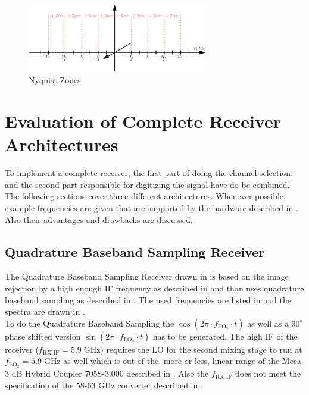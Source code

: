 \begin{figure}[p]
  \centering
  \includegraphics[width=0.7\textwidth]{figures/rx_adc_2_nyquist_zones}
  \caption{Nyquist-Zones}
  \label{fig:rx_adc_2_nyquist_zones}
\end{figure}

\section{Evaluation of Complete Receiver Architectures}
To implement a complete receiver, the first part of doing the channel selection,
and the second part responsible for digitizing the signal have do be combined. \\

The following sections cover three different architectures. Whenever possible,
example frequencies are given that are supported by the hardware described in
. Also their advantages and drawbacks are discussed. \\

\subsection{Quadrature Baseband Sampling Receiver}
\label{sec:rx_0}
The Quadrature Baseband Sampling Receiver drawn in 
is based on the image rejection by a high enough \gls{IF} frequency as
described in  and than uses quadrature baseband sampling
as described in .
The used frequencies are listed in  and the spectra are drawn
in . \\

To do the Quadrature Baseband Sampling the
$\cos(2\pi \cdot f_{\text{LO}_2} \cdot t)$ as well as a $90^\circ$
phase shifted version $\sin(2\pi \cdot f_{\text{LO}_2} \cdot t)$ has to be
generated.
The high \gls{IF} of the receiver ($f_{\text{RX IF}} = 5.9 \;\text{GHz}$)
requires the \gls{LO} for the second mixing stage to run at
$f_{\text{LO}_2} = 5.9 \;\text{GHz}$ as well which is out of the, more or less,
linear range of the Meca 3 dB Hybrid Coupler 705S-3.000 described in
. Also the $f_{\text{RX IF}}$ does not meet the
specification of the 58-63 GHz converter described in
. \\

